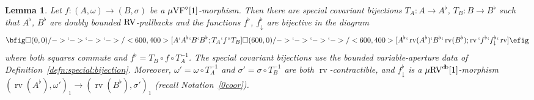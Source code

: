 \documentclass[12pt]{amsart}
\theoremstyle{plain}
\newtheorem{lem}[thm]{Lemma}
\theoremstyle{definition}
\theoremstyle{remark}
\numberwithin{equation}{section}
\theoremstyle{plain}
\newcommand{\VF}{\textup{VF}}
\newcommand{\RV}{\textup{RV}}
\newcommand{\0}{\emptyset}
\newcommand{\fun}{\longrightarrow}
\newcommand{\mgVF}{{\mu} {\VF}}
\newcommand{\mRV}{{\mu}{\RV}}
\DeclareMathOperator{\rv}{rv}
\DeclareMathOperator{\db}{d \! b}
\begin{document}
\begin{lem}\label{simul:special:dim:1}
Let $f : (A, \omega) \fun (B, \sigma)$ be a $\mgVF^{\diamond}[1]$-morphism.  Then there are special covariant bijections $T_A : A \fun A^{\flat}$, $T_B : B \fun B^{\flat}$ such that $A^{\flat}$, $B^{\flat}$ are doubly bounded $\RV$-pullbacks and the functions $f^{\flat}$, $f^{\flat}_{\downarrow}$ are bijective in
the diagram
\[
\bfig
  \square(0,0)/->`->`->`->/<600,400>[A`A^{\flat}`B`B^{\flat};
  T_A`f``T_B]
 \square(600,0)/->`->`->`->/<600,400>[A^{\flat}`\rv(A^{\flat})`B^{\flat} `\rv(B^{\flat});  \rv`f^{\flat}`f^{\flat}_{\downarrow}`\rv]
 \efig
\]
where both squares commute and $f^\flat=T_B\circ f\circ T_A^{-1}$. The special covariant bijections use the bounded variable-aperture data of Definition~\ref{defn:special:bijection}. Moreover, $\omega' = \omega \circ T_A^{-1}$ and $\sigma' = \sigma \circ T_B^{-1}$ are both $\rv$-contractible, and  $f^{\flat}_{\downarrow}$ is a $\mRV^{\db}[1]$-morphism $(\rv(A^{\flat}), \omega')_{1} \fun (\rv(B^{\flat}), \sigma')_1$ (recall Notation~\ref{0coor}).
\end{lem}
\end{document}
